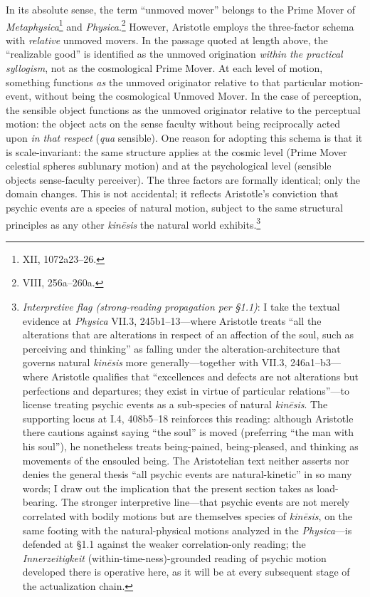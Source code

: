 In its absolute sense, the term ``unmoved mover'' belongs to the Prime Mover of \textit{Metaphysica}\footnote{XII, 1072a23--26.} and \textit{Physica}.\footnote{VIII, 256a--260a.} However, Aristotle employs the three-factor schema with \textit{relative} unmoved movers. In the passage quoted at length above, the ``realizable good'' is identified as the unmoved origination \textit{within the practical syllogism}, not as the cosmological Prime Mover. At each level of motion, something functions \textit{as} the unmoved originator relative to that particular motion-event, without being the cosmological Unmoved Mover. In the case of perception, the sensible object functions as the unmoved originator relative to the perceptual motion: the object acts on the sense faculty without being reciprocally acted upon \textit{in that respect} (\textit{qua} sensible). One reason for adopting this schema is that it is scale-invariant: the same structure applies at the cosmic level (Prime Mover \ra celestial spheres \ra sublunary motion) and at the psychological level (sensible objects \ra sense-faculty \ra perceiver). The three factors are formally identical; only the domain changes. This is not accidental; it reflects Aristotle's conviction that psychic events are a species of natural motion, subject to the same structural principles as any other \textit{kinēsis} the natural world exhibits.\footnote{\textit{Interpretive flag (strong-reading propagation per \S 1.1)}: I take the textual evidence at \textit{Physica} VII.3, 245b1--13---where Aristotle treats ``all the alterations that are alterations in respect of an affection of the soul, such as perceiving and thinking'' as falling under the alteration-architecture that governs natural \textit{kinēsis} more generally---together with VII.3, 246a1--b3---where Aristotle qualifies that ``excellences and defects are not alterations but perfections and departures; they exist in virtue of particular relations''---to license treating psychic events as a sub-species of natural \textit{kinēsis}. The supporting locus at \cite{aristotle2014soul} I.4, 408b5--18 reinforces this reading: although Aristotle there cautions against saying ``the soul'' is moved (preferring ``the man with his soul''), he nonetheless treats being-pained, being-pleased, and thinking as movements of the ensouled being. The Aristotelian text neither asserts nor denies the general thesis ``all psychic events are natural-kinetic'' in so many words; I draw out the implication that the present section takes as load-bearing. The stronger interpretive line---that psychic events are not merely correlated with bodily motions but are themselves species of \textit{kinēsis}, on the same footing with the natural-physical motions analyzed in the \textit{Physica}---is defended at \S 1.1 against the weaker correlation-only reading; the \textit{Innerzeitigkeit} (within-time-ness)-grounded reading of psychic motion developed there is operative here, as it will be at every subsequent stage of the actualization chain.}

